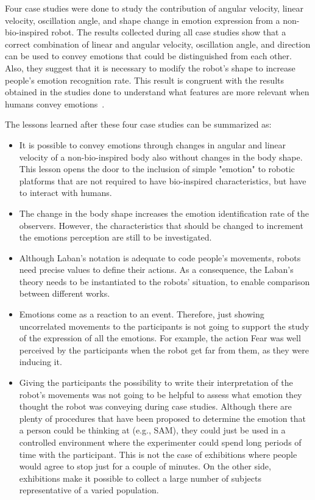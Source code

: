 Four case studies were done to study the contribution of angular velocity, linear velocity, oscillation angle, and shape change in emotion expression from a non-bio-inspired robot. The results collected during all case studies show that a correct combination of linear and angular velocity, oscillation angle, and direction can be used to convey emotions that could be distinguished from each other. Also, they suggest that it is necessary to modify the robot's shape to increase people's emotion recognition rate. This result is congruent with the results obtained in the studies done to understand what features are more relevant when humans convey emotions~\cite{Roether2009,Venture2014}.

The lessons learned after these four case studies can be summarized as:

\begin{itemize}
	
	\item It is possible to convey emotions through changes in angular and linear velocity of a non-bio-inspired body also without changes in the body shape. This lesson opens the door to the inclusion of simple "emotion" to robotic platforms that are not required to have bio-inspired characteristics, but have to interact with humans.
	
	\item The change in the body shape increases the emotion identification rate of the observers. However, the characteristics that should be changed to increment the emotions perception are still to be investigated.
	
	\item Although Laban's notation is adequate to code people's movements, robots need precise values to define their actions. As a consequence, the Laban's theory needs to be instantiated to the robots' situation, to enable comparison between different works.
	
	\item Emotions come as a reaction to an event. Therefore, just showing uncorrelated movements to the participants is not going to support the study of the expression of all the emotions. For example, the action Fear was well perceived by the participants when the robot get far from them, as they were inducing it.
	
	\item Giving the participants the possibility to write their interpretation of the robot's movements was not going to be helpful to assess what emotion they thought the robot was conveying during case studies. Although there are plenty of procedures that have been proposed to determine the emotion that a person could be thinking at (e.g., SAM), they could just be used in a controlled environment where the experimenter could spend long periods of time with the participant. This is not the case of exhibitions where people would agree to stop just for a couple of minutes. On the other side, exhibitions make it possible to collect a large number of subjects representative of a varied population.
	

\end{itemize}
